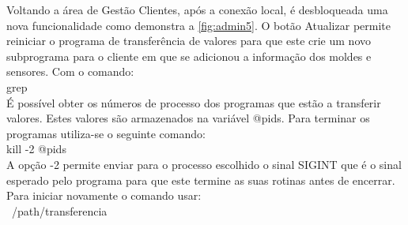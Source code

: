 \documentclass[11pt,twoside,a4paper]{report}
\begin{document}
Voltando a área de Gestão Clientes, após a conexão local, é desbloqueada uma nova funcionalidade como demonstra a \autoref{fig:admin5}. O botão Atualizar permite reiniciar o programa de transferência de valores para que este crie um novo subprograma para o cliente em que se adicionou a informação dos moldes e sensores. Com o comando:\\
grep\\
É possível obter os números de processo dos programas que estão a transferir valores. Estes valores são armazenados na variável @pids. Para terminar os programas utiliza-se o seguinte comando:\\
kill -2 @pids\\
A opção -2 permite enviar para o processo escolhido o sinal SIGINT que é o sinal esperado pelo programa para que este termine as suas rotinas antes de encerrar. Para iniciar novamente o comando usar:\\
~/path/transferencia
\end{document}
